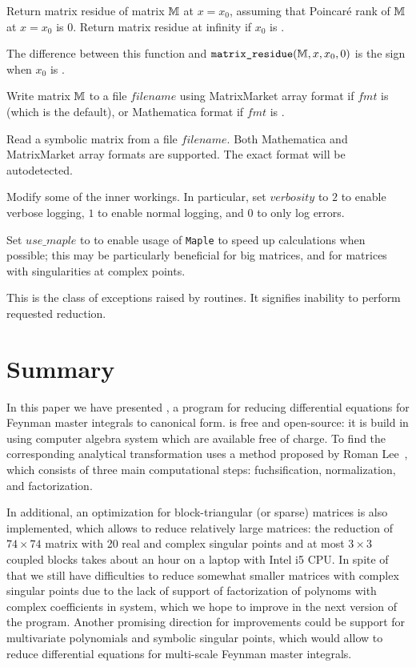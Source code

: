 \documentclass[12pt,a4paper]{article}
\begin{document}
\begin{description}[style=nextline]
Return matrix residue of matrix $\mathbb{M}$ at $x=x_0$, assuming that Poincar\'e rank of $\mathbb{M}$ at $x=x_0$ is $0$.
Return matrix residue at infinity if $x_0$ is .

The difference between this function and $\texttt{matrix\_residue}(\mathbb{M}, x, x_0, 0)$ is the sign when $x_0$ is .

Write matrix $\mathbb{M}$ to a file $filename$ using MatrixMarket array format if $fmt$ is  (which is the default), or Mathematica format if $fmt$ is .

Read a symbolic matrix from a file $filename$.
Both Mathematica and MatrixMarket array formats are supported.
The exact format will be autodetected.

Modify some of the \fuchsia inner workings.
In particular, set $verbosity$ to $2$ to enable verbose logging, $1$ to enable normal logging, and $0$ to only log errors.

Set $use\_maple$ to  to enable usage of \texttt{Maple} to speed up calculations when possible; this may be particularly beneficial for big matrices, and for matrices with singularities at complex points.

This is the class of exceptions raised by \fuchsia routines.
It signifies inability to perform requested reduction. 

\end{description}


\section{Summary}
\label{sec:4}

In this paper we have presented \fuchsia, a program for reducing differential equations for Feynman master integrals to canonical form.
\fuchsia is free and open-source: it is build in \python using \maximasage computer algebra system which are available free of charge.
To find the corresponding analytical transformation \fuchsia uses a method proposed by Roman Lee~\cite{Lee15}, which consists of three main computational steps: fuchsification, normalization, and factorization.

In additional, an optimization for block-triangular (or sparse) matrices is also implemented, which allows to reduce relatively large matrices: the reduction of ${74\times74}$ matrix with 20 real and complex singular points and at most $3\times3$ coupled blocks takes about an hour on a laptop with Intel i5 CPU.
In spite of that we still have difficulties to reduce somewhat smaller matrices with complex singular points due to the lack of support of factorization of polynoms with complex coefficients in \maximasage system, which we hope to improve in the next version of the program.
Another promising direction for improvements could be support for multivariate polynomials and symbolic singular points, which would allow to reduce differential equations for multi-scale Feynman master integrals.
\end{document}
